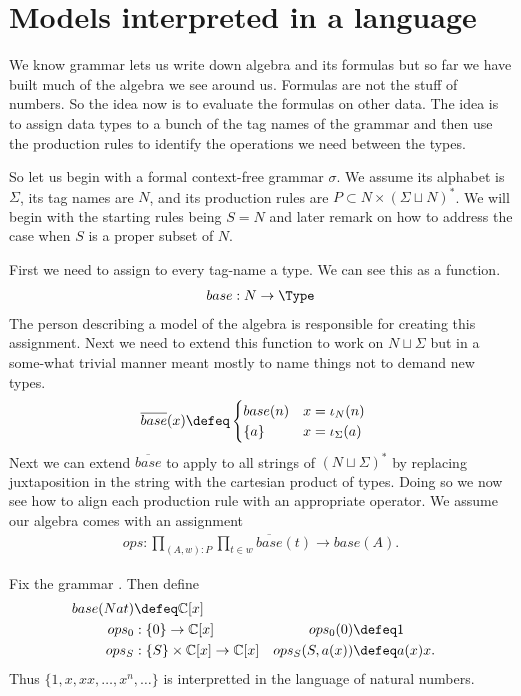 \section{Models interpreted in a language}

We know grammar lets us write down algebra and its formulas but so 
far we have built much of the algebra we see around us.  Formulas 
are not the stuff of numbers.  So the idea now is to evaluate the 
formulas on other data. The idea is to assign data types to a 
bunch of the tag names of the grammar and then use the production 
rules to identify the operations we need between the types.

So let us begin with a formal context-free grammar $\sigma$.
We assume its alphabet is $\Sigma$, its tag names are $N$, 
and its production rules are $P\subset N\times (\Sigma\sqcup N)^*$.
We will begin with the starting rules being $S=N$ and later remark on 
how to address the case when $S$ is a proper subset of $N$.

First we need to assign to every tag-name a type.  We can see this 
as a function.
\begin{align*}
    base:N\to \Type
\end{align*}
The person describing a model of the algebra is responsible for 
creating this assignment.  Next we need to extend this function 
to work on $N\sqcup \Sigma$ but in a some-what trivial manner 
meant mostly to name things not to demand new types.
\begin{align*}
    \overline{base}(x) & \defeq \begin{cases}
        base(n) & x=\iota_N(n)\\
        \{a\} & x=\iota_{\Sigma}(a)
    \end{cases}
\end{align*}
Next we can extend $\overline{base}$ to apply to all 
strings of $(N\sqcup \Sigma)^*$ by replacing juxtaposition 
in the string with the cartesian product of types.  Doing so 
we now see how to align each production rule with an appropriate 
operator.  We assume 
our algebra comes with an assignment
\begin{align*}
    ops:\prod_{(A,w):P}\prod_{t\in w}\overline{base}(t)\to base(A).
\end{align*}

\begin{example}
    Fix the grammar .
    Then define 
    \begin{align*}
        base(Nat) & \defeq \mathbb{C}[x]\\
        ops_0 & : \{0\}\to \mathbb{C}[x] &  ops_0(0) & \defeq 1\\
        ops_S & : \{S\}\times \mathbb{C}[x]\to \mathbb{C}[x] &  ops_S(S,a(x)) & \defeq a(x)x.
    \end{align*}
    Thus $\{1,x,xx,\ldots, x^n,\ldots\}$ is interpretted in the language 
    of natural numbers.
\end{example}